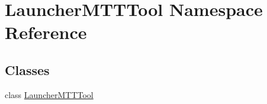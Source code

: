 \hypertarget{namespace_launcher_m_t_t_tool}{\section{Launcher\-M\-T\-T\-Tool Namespace Reference}
\label{namespace_launcher_m_t_t_tool}
}
\subsection*{Classes}
\begin{DoxyCompactItemize}
\item 
class \hyperlink{class_launcher_m_t_t_tool_1_1_launcher_m_t_t_tool}{Launcher\-M\-T\-T\-Tool}
\end{DoxyCompactItemize}
